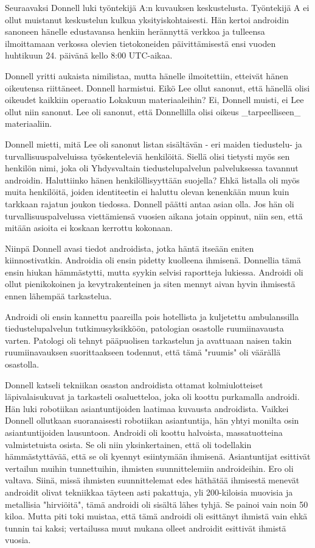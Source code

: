 Seuraavaksi Donnell luki työntekijä A:n kuvauksen keskustelusta. Työntekijä A ei ollut muistanut keskustelun kulkua yksityiskohtaisesti. Hän kertoi androidin sanoneen hänelle edustavansa henkiin herännyttä verkkoa ja tulleensa ilmoittamaan verkossa olevien tietokoneiden päivittämisestä ensi vuoden huhtikuun 24. päivänä kello 8:00 UTC-aikaa.


Donnell yritti aukaista nimilistaa, mutta hänelle ilmoitettiin, etteivät hänen oikeutensa riittäneet. Donnell harmistui. Eikö Lee ollut sanonut, että hänellä olisi oikeudet kaikkiin operaatio Lokakuun materiaaleihin? Ei, Donnell muisti, ei Lee ollut niin sanonut. Lee oli sanonut, että Donnellilla olisi oikeus _tarpeelliseen_ materiaaliin.


Donnell mietti, mitä Lee oli sanonut listan sisältävän - eri maiden tiedustelu- ja turvallisuuspalveluissa työskenteleviä henkilöitä. Siellä olisi tietysti myös sen henkilön nimi, joka oli Yhdysvaltain tiedustelupalvelun palveluksessa tavannut androidin. Haluttiinko hänen henkilöllisyyttään suojella? Ehkä listalla oli myös muita henkilöitä, joiden identiteetin ei haluttu olevan kenenkään muun kuin tarkkaan rajatun joukon tiedossa. Donnell päätti antaa asian olla. Jos hän oli turvallisuuspalvelussa viettämiensä vuosien aikana jotain oppinut, niin sen, että mitään asioita ei koskaan kerrottu kokonaan.


Niinpä Donnell avasi tiedot androidista, jotka häntä itseään eniten kiinnostivatkin. Androidia oli ensin pidetty kuolleena ihmisenä. Donnellia tämä ensin hiukan hämmästytti, mutta syykin selvisi raportteja lukiessa. Androidi oli ollut pienikokoinen ja kevytrakenteinen ja siten mennyt aivan hyvin ihmisestä ennen lähempää tarkastelua.


Androidi oli ensin kannettu paareilla pois hotellista ja kuljetettu ambulanssilla tiedustelupalvelun tutkimusyksikköön, patologian osastolle ruumiinavausta varten. Patologi oli tehnyt pääpuolisen tarkastelun ja avattuaan naisen takin ruumiinavauksen suorittaakseen todennut, että tämä "ruumis" oli väärällä osastolla.


Donnell katseli tekniikan osaston androidista ottamat kolmiulotteiset läpivalaisukuvat ja tarkasteli osaluetteloa, joka oli koottu purkamalla androidi. Hän luki robotiikan asiantuntijoiden laatimaa kuvausta androidista. Vaikkei Donnell ollutkaan suoranaisesti robotiikan asiantuntija, hän yhtyi monilta osin asiantuntijoiden lausuntoon. Androidi oli koottu halvoista, massatuotteina valmistetuista osista. Se oli niin yksinkertainen, että oli todellakin hämmästyttävää, että se oli kyennyt esiintymään ihmisenä. Asiantuntijat esittivät vertailun muihin tunnettuihin, ihmisten suunnittelemiin androideihin. Ero oli valtava. Siinä, missä ihmisten suunnittelemat edes häthätää ihmisestä menevät androidit olivat tekniikkaa täyteen asti pakattuja, yli 200-kiloisia muovisia ja metallisia "hirviöitä", tämä androidi oli sisältä lähes tyhjä. Se painoi vain noin 50 kiloa. Mutta piti toki muistaa, että tämä androidi oli esittänyt ihmistä vain ehkä tunnin tai kaksi; vertailussa muut mukana olleet androidit esittivät ihmistä vuosia.


